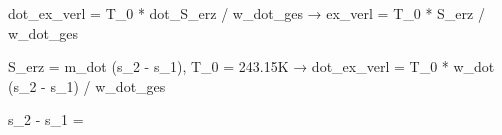 dot_ex_verl = T_0 * dot_S_erz / w_dot_ges → ex_verl = T_0 * S_erz / w_dot_ges  

S_erz = m_dot (s_2 - s_1), T_0 = 243.15K  
→ dot_ex_verl = T_0 * w_dot (s_2 - s_1) / w_dot_ges  

s_2 - s_1 =